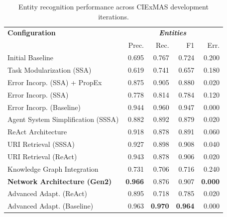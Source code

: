 \documentclass[a4paper,oneside,bibliography=totoc]{scrbook}
\begin{document}
\begin{table}[h]
  \centering
  \begin{tabular}{p{6cm}|rrrr}
    \toprule
    \textbf{Configuration}               & \multicolumn{4}{c}{\textit{\textbf{Entities}}}                                                    \\
                                         & Prec.                                          & Rec.           & F1             & Err.           \\
    \midrule
    Initial Baseline                     & 0.695                                          & 0.767          & 0.724          & 0.200          \\
    Task Modularization (SSA)            & 0.619                                          & 0.741          & 0.657          & 0.180          \\
    Error Incorp. (SSA) + PropEx         & 0.875                                          & 0.905          & 0.880          & 0.020          \\
    Error Incorp. (SSA)                  & 0.778                                          & 0.814          & 0.784          & 0.120          \\
    Error Incorp. (Baseline)             & 0.944                                          & 0.960          & 0.947          & 0.000          \\
    Agent System Simplification (SSSA)   & 0.882                                          & 0.892          & 0.879          & 0.020          \\
    ReAct Architecture                   & 0.918                                          & 0.878          & 0.891          & 0.060          \\
    \ac{URI} Retrieval (SSSA)            & 0.927                                          & 0.898          & 0.908          & 0.040          \\
    \ac{URI} Retrieval (ReAct)           & 0.943                                          & 0.878          & 0.906          & 0.020          \\
    Knowledge Graph Integration          & 0.731                                          & 0.706          & 0.716          & 0.240          \\
    \textbf{Network Architecture (Gen2)} & \textbf{0.966}                                 & 0.876          & 0.907          & \textbf{0.000} \\
    Advanced Adapt. (ReAct)              & 0.895                                          & 0.718          & 0.785          & 0.020          \\
    Advanced Adapt. (Baseline)           & 0.963                                          & \textbf{0.970} & \textbf{0.964} & 0.000          \\
    \bottomrule
  \end{tabular}
  \caption{Entity recognition performance across CIExMAS development iterations.}
  \label{tab:evaluation_entities_iterations}
\end{table}
\end{document}

